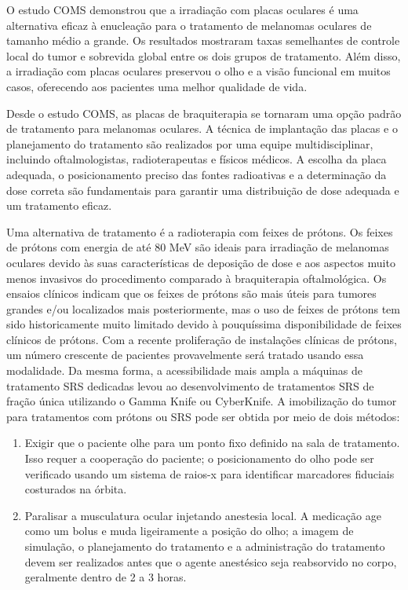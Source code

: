 \documentclass[11pt,a4paper]{article}
\begin{document}
    O estudo COMS demonstrou que a irradiação com placas oculares é uma alternativa eficaz à enucleação para o tratamento de melanomas oculares de tamanho médio a grande. Os resultados mostraram taxas semelhantes de controle local do tumor e sobrevida global entre os dois grupos de tratamento. Além disso, a irradiação com placas oculares preservou o olho e a visão funcional em muitos casos, oferecendo aos pacientes uma melhor qualidade de vida.

    Desde o estudo COMS, as placas de braquiterapia se tornaram uma opção padrão de tratamento para melanomas oculares. A técnica de implantação das placas e o planejamento do tratamento são realizados por uma equipe multidisciplinar, incluindo oftalmologistas, radioterapeutas e físicos médicos. A escolha da placa adequada, o posicionamento preciso das fontes radioativas e a determinação da dose correta são fundamentais para garantir uma distribuição de dose adequada e um tratamento eficaz.
    
    Uma alternativa de tratamento é a radioterapia com feixes de prótons. Os feixes de prótons com energia de até 80 MeV são ideais para irradiação de melanomas oculares devido às suas características de deposição de dose e aos aspectos muito menos invasivos do procedimento comparado à braquiterapia oftalmológica. Os ensaios clínicos indicam que os feixes de prótons são mais úteis para tumores grandes e/ou localizados mais posteriormente, mas o uso de feixes de prótons tem sido historicamente muito limitado devido à pouquíssima disponibilidade de feixes clínicos de prótons. Com a recente proliferação de instalações clínicas de prótons, um número crescente de pacientes provavelmente será tratado usando essa modalidade. Da mesma forma, a acessibilidade mais ampla a máquinas de tratamento SRS dedicadas levou ao desenvolvimento de tratamentos SRS de fração única utilizando o Gamma Knife ou CyberKnife. A imobilização do tumor para tratamentos com prótons ou SRS pode ser obtida por meio de dois métodos:

    \begin{enumerate}
        \item Exigir que o paciente olhe para um ponto fixo definido na sala de tratamento. Isso requer a cooperação do paciente; o posicionamento do olho pode ser verificado usando um sistema de raios-x para identificar marcadores fiduciais costurados na órbita.
        \item Paralisar a musculatura ocular injetando anestesia local. A medicação age como um bolus e muda ligeiramente a posição do olho; a imagem de simulação, o planejamento do tratamento e a administração do tratamento devem ser realizados antes que o agente anestésico seja reabsorvido no corpo, geralmente dentro de 2 a 3 horas.
    \end{enumerate}
    
\end{document}
